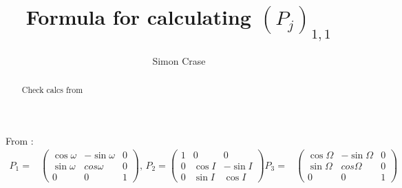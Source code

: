 \documentclass[]{article}
\title{Formula for calculating $(P_j)_{1,1}$}
\author{Simon Crase}
\begin{document}
\maketitle

\begin{abstract}
Check calcs from \cite{ssd}
\end{abstract}

\section{}

From  \cite[(2.119) and (2.120)]{ssd}:
\begin{align*}
P_1 =& \begin{pmatrix}
\cos \omega & - \sin \omega & 0\\
\sin \omega & cos \omega & 0\\
0 & 0  & 1
\end{pmatrix}
\text{, }
P_2 = \begin{pmatrix}
1 & 0 & 0\\
0 & \cos I & - \sin I\\
0 & \sin I & \cos I
\end{pmatrix}
P_3 =& \begin{pmatrix}
\cos \Omega & - \sin \Omega & 0\\
\sin \Omega & cos \Omega & 0\\
0 & 0  & 1
\end{pmatrix}
\end{align*}
\end{document}
